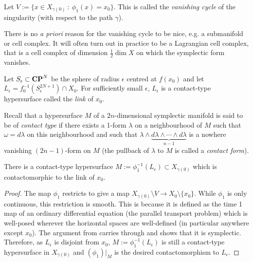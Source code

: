 \documentclass{article}
\begin{document}
\begin{Definition}\label{dfn:vc}
Let \(V:=\{x\in X_{\gamma(0)}\ :\ \phi_1(x)=x_0\}\). This is called
the {\em vanishing cycle} of the singularity (with respect to the
path \(\gamma\)).


\end{Definition}
\begin{Remark}
There is no {\em a priori} reason for the vanishing cycle to be
nice, e.g. a submanifold or cell complex. It will often turn out in
practice to be a Lagrangian cell complex, that is a cell complex of
dimension \(\frac{1}{2}\dim X\) on which the symplectic form
vanishes.


\end{Remark}
\begin{Definition}[Link]\label{dfn:link}
Let \(S_\epsilon\subset\mathbf{CP}^{N}\) be the sphere of radius \(\epsilon\)
centred at \(f(x_0)\) and let
\(L_\epsilon=f_0^{-1}(S^{2N+1}_\epsilon)\cap X_0\). For sufficiently
small \(\epsilon\), \(L_\epsilon\) is a contact-type hypersurface
called the {\em link} of \(x_0\).


\end{Definition}
\begin{Remark}
Recall that a hypersurface \(M\) of a \(2n\)-dimensional symplectic
manifold is said to be of {\em contact type} if there exists a
1-form \(\lambda\) on a neighbourhood of \(M\) such that
\(\omega=d\lambda\) on this neighbourhood and such that
\(\lambda\wedge \underbrace{d\lambda \wedge \cdots\wedge
d\lambda}_{n-1}\) is a nowhere vanishing \((2n-1)\)-form on \(M\)
(the pullback of \(\lambda\) to \(M\) is called a {\em contact
form}).


\end{Remark}
\begin{Lemma}
There is a contact-type hypersurface
\(M:=\phi_1^{-1}(L_{\epsilon})\subset X_{\gamma(0)}\) which is
contactomorphic to the link of \(x_0\).
\end{Lemma}
\begin{proof}
The map \(\phi_1\) restricts to give a map \(X_{\gamma(0)}\setminus
V\to X_0\setminus\{x_0\}\). While \(\phi_1\) is only continuous,
this restriction is smooth. This is because it is defined as the
time 1 map of an ordinary differential equation (the parallel
transport problem) which is well-posed wherever the horizontal
spaces are well-defined (in particular anywhere except \(x_0\)). The
argument from {\cite[Lemma 6.18]{McDuffSalamon}} carries through and
shows that it is symplectic. Therefore, as \(L_{\epsilon}\) is
disjoint from \(x_0\), \(M:=\phi_1^{-1}(L_\epsilon)\) is still a
contact-type hypersurface in \(X_{\gamma(0)}\) and \((\phi_1)|_{M}\)
is the desired contactomorphism to \(L_\epsilon\). \qedhere


\end{proof}
\end{document}
